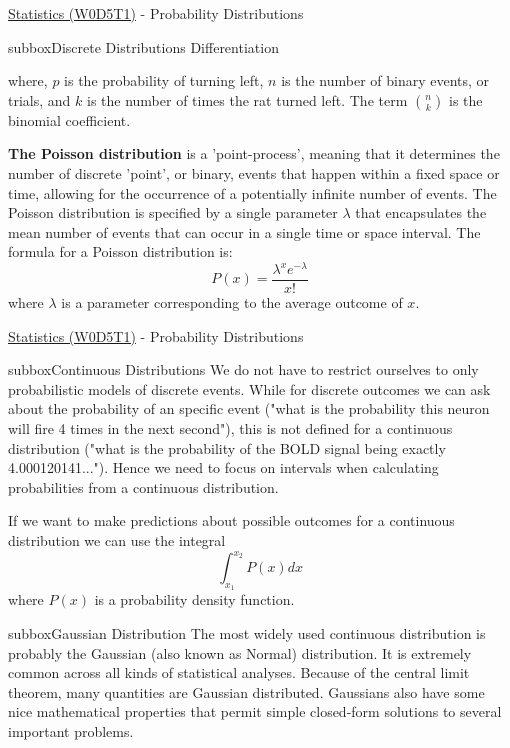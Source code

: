 \begin{multicols}{3}
\begin{textbox}{\href{https://compneuro.neuromatch.io/tutorials/W0D5_Statistics/student/W0D5_Tutorial1.html}{Statistics (W0D5T1)} - Probability Distributions}
\begin{subbox}{subbox}{Discrete Distributions Differentiation}
{where, $p$ is the probability of turning left, $n$ is the number of binary events, or trials, and $k$ is the number of times the rat turned left. The term $\binom {n}{k}$ is the binomial coefficient.

\textbf{The Poisson distribution} is a 'point-process', meaning that it determines the number of discrete 'point', or binary, events that happen within a fixed space or time, allowing for the occurrence of a potentially infinite number of events. The Poisson distribution is specified by a single parameter $\lambda$ that encapsulates the mean number of events that can occur in a single time or space interval.
The formula for a Poisson distribution is: 
\begin{equation}
P(x)=\frac{\lambda^x e^{-\lambda}}{x!}
\end{equation}
where $\lambda$ is a parameter corresponding to the average outcome of $x$.
}
\end{subbox}
\end{textbox}
\begin{textbox}{\href{https://compneuro.neuromatch.io/tutorials/W0D5_Statistics/student/W0D5_Tutorial1.html}{Statistics (W0D5T1)} - Probability Distributions}
\begin{subbox}{subbox}{Continuous Distributions}
\scriptsize
We do not have to restrict ourselves to only probabilistic models of discrete events. 
While for discrete outcomes we can ask about the probability of an specific event ("what is the probability this neuron will fire 4 times in the next second"), this is not defined for a continuous distribution ("what is the probability of the BOLD signal being exactly 4.000120141..."). Hence we need to focus on intervals when calculating probabilities from a continuous distribution. 

If we want to make predictions about possible outcomes for a continuous distribution we can use the integral
\begin{equation} 
\int_{x_1}^{x_2} P(x) dx 
\end{equation}
where $P(x)$ is a probability density function.

\end{subbox}
\begin{subbox}{subbox}{Gaussian Distribution}
\scriptsize
The most widely used continuous distribution is probably the Gaussian (also known as Normal) distribution. It is extremely common across all kinds of statistical analyses. Because of the central limit theorem, many quantities are Gaussian distributed. Gaussians also have some nice mathematical properties that permit simple closed-form solutions to several important problems. 


\end{subbox}
\end{textbox}
\end{multicols}
